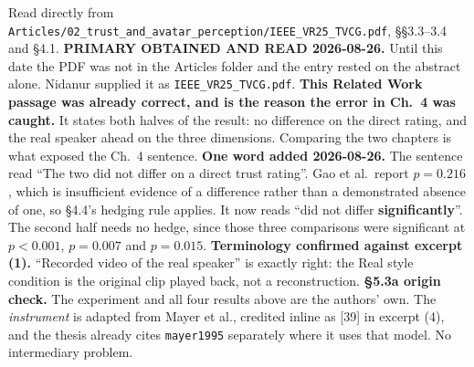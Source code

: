 \documentclass[11pt, a4paper]{article}
\begin{document}
\begin{Form}
  {Read directly from \texttt{\footnotesize Articles/02\_trust\_and\_avatar\_perception/IEEE\_VR25\_TVCG.pdf}, \S\S3.3--3.4 and \S4.1. \textbf{PRIMARY OBTAINED AND READ 2026-08-26.} Until this date the PDF was not in the Articles folder and the entry rested on the abstract alone. Nidanur supplied it as \texttt{IEEE\_VR25\_TVCG.pdf}. \textbf{This Related Work passage was already correct, and is the reason the error in Ch.~4 was caught.} It states both halves of the result: no difference on the direct rating, and the real speaker ahead on the three dimensions. Comparing the two chapters is what exposed the Ch.~4 sentence. \textbf{One word added 2026-08-26.} The sentence read ``The two did not differ on a direct trust rating''. Gao et al.\ report $p = 0.216$, which is insufficient evidence of a difference rather than a demonstrated absence of one, so \S4.4's hedging rule applies. It now reads ``did not differ \textbf{significantly}''. The second half needs no hedge, since those three comparisons were significant at $p < 0.001$, $p = 0.007$ and $p = 0.015$. \textbf{Terminology confirmed against excerpt (1).} ``Recorded video of the real speaker'' is exactly right: the Real style condition is the original clip played back, not a reconstruction. \textbf{\S5.3a origin check.} The experiment and all four results above are the authors' own. The \emph{instrument} is adapted from Mayer et al., credited inline as [39] in excerpt (4), and the thesis already cites \texttt{mayer1995} separately where it uses that model. No intermediary problem.}


\end{Form}
\end{document}

